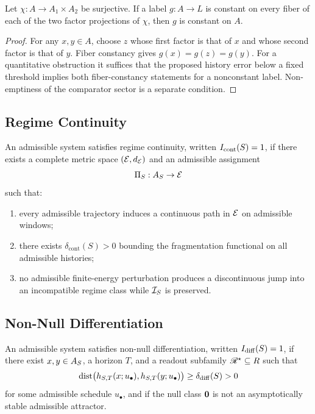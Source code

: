 \begin{lemma}\label{lem:two-factor-label-obstruction}
Let $\chi:A\to A_1\times A_2$ be surjective. If a label $g:A\to L$ is constant on every fiber of each of the two factor projections of $\chi$, then $g$ is constant on $A$.
\end{lemma}

\begin{proof}
For any $x,y\in A$, choose $z$ whose first factor is that of $x$ and whose second factor is that of $y$. Fiber constancy gives $g(x)=g(z)=g(y)$. For a quantitative obstruction it suffices that the proposed history error below a fixed threshold implies both fiber-constancy statements for a nonconstant label. Non-emptiness of the comparator sector is a separate condition.
\end{proof}


\subsection{Regime Continuity}

\begin{definition}\label{def:icont}
An admissible system satisfies regime continuity, written $I_{\mathrm{cont}}(S)=1$, if there exists a complete metric space $(\mathcal{E},d_{\mathcal{E}})$ and an admissible assignment
\[
\Pi_S:A_S\to \mathcal{E}
\]
such that:
\begin{enumerate}[leftmargin=1.5em]
\item every admissible trajectory induces a continuous path in $\mathcal{E}$ on admissible windows;
\item there exists $\delta_{\mathrm{cont}}(S)>0$ bounding the fragmentation functional on all admissible histories;
\item no admissible finite-energy perturbation produces a discontinuous jump into an incompatible regime class while $\mathcal{I}_S$ is preserved.
\end{enumerate}
\end{definition}

\subsection{Non-Null Differentiation}

\begin{definition}\label{def:idiff}
An admissible system satisfies non-null differentiation, written $I_{\mathrm{diff}}(S)=1$, if there exist $x,y\in A_S$, a horizon $T$, and a readout subfamily $\mathscr{R}^\star\subseteq R$ such that
\[
\operatorname{dist}\bigl(h_{S,T}(x;u_\bullet),h_{S,T}(y;u_\bullet)\bigr)\ge \delta_{\mathrm{diff}}(S)>0
\]
for some admissible schedule $u_\bullet$, and if the null class $\mathbf{0}$ is not an asymptotically stable admissible attractor.
\end{definition}

